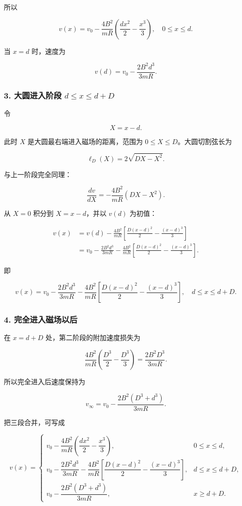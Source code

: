 \documentclass[12pt,a4paper,UTF8]{ctexart}
\begin{document}
所以

\[
\boxed{
v(x)=v_0-\frac{4B^2}{mR}
\left(\frac{d x^2}{2}-\frac{x^3}{3}\right),
\quad 0\le x\le d
}.
\]

当 \(x=d\) 时，速度为

\[
v(d)=v_0-\frac{2B^2d^3}{3mR}.
\]

\subsubsection{\texorpdfstring{3. 大圆进入阶段
\(d\le x\le d+D\)}{3. 大圆进入阶段 d\textbackslash le x\textbackslash le d+D}}\label{ux5927ux5706ux8fdbux5165ux9636ux6bb5-dle-xle-dd}

令

\[
X=x-d.
\]

此时 \(X\) 是大圆最右端进入磁场的距离，范围为
\(0\le X\le D\)。大圆切割弦长为

\[
\ell_D(X)=2\sqrt{DX-X^2}.
\]

与上一阶段完全同理：

\[
\frac{dv}{dX}=-\frac{4B^2}{mR}(DX-X^2).
\]

从 \(X=0\) 积分到 \(X=x-d\)，并以 \(v(d)\) 为初值：

\[
\begin{aligned}
v(x)
&=v(d)-\frac{4B^2}{mR}
\left[\frac{D(x-d)^2}{2}-\frac{(x-d)^3}{3}\right]\\
&=v_0-\frac{2B^2d^3}{3mR}
-\frac{4B^2}{mR}
\left[\frac{D(x-d)^2}{2}-\frac{(x-d)^3}{3}\right].
\end{aligned}
\]

即

\[
\boxed{
v(x)=v_0-\frac{2B^2d^3}{3mR}
-\frac{4B^2}{mR}
\left[\frac{D(x-d)^2}{2}-\frac{(x-d)^3}{3}\right],
\quad d\le x\le d+D
}.
\]

\subsubsection{4.
完全进入磁场以后}\label{ux5b8cux5168ux8fdbux5165ux78c1ux573aux4ee5ux540e}

在 \(x=d+D\) 处，第二阶段的附加速度损失为

\[
\frac{4B^2}{mR}\left(\frac{D^3}{2}-\frac{D^3}{3}\right)
=\frac{2B^2D^3}{3mR}.
\]

所以完全进入后速度保持为

\[
\boxed{
v_\infty=v_0-\frac{2B^2(D^3+d^3)}{3mR}
}.
\]

把三段合并，可写成

\[
v(x)=
\begin{cases}
v_0-\dfrac{4B^2}{mR}
\left(\dfrac{dx^2}{2}-\dfrac{x^3}{3}\right),
&0\le x\le d,\\[8pt]
v_0-\dfrac{2B^2d^3}{3mR}
-\dfrac{4B^2}{mR}
\left[\dfrac{D(x-d)^2}{2}-\dfrac{(x-d)^3}{3}\right],
&d\le x\le d+D,\\[8pt]
v_0-\dfrac{2B^2(D^3+d^3)}{3mR},
&x\ge d+D.
\end{cases}
\]
\end{document}
